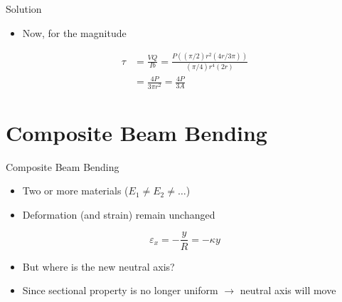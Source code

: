 \documentclass[10pt, svgnames]{beamer}
\begin{document}
\begin{frame}[label={sec:org01c7e02}]{Solution}
\begin{itemize}
\item Now, for the magnitude
\end{itemize}

\begin{align*}
  \tau &= \frac{VQ}{Ib} = \frac{P ((\pi/2) r^{2} (4r/3\pi))}{(\pi/4)r^{4}(2r)} \\
       &= \frac{4P}{3 \pi r^{2}} = \frac{4P}{3A}
\end{align*}
\end{frame}

\section{Composite Beam Bending}
\label{composite-beam-bending}
\begin{frame}[label={sec:org819f415}]{Composite Beam Bending}
\begin{itemize}
\item Two or more materials (\(E_{1} \neq E_{2} \neq \ldots\))

\item Deformation (and strain) remain unchanged
\end{itemize}

\[\varepsilon_x = -\frac{y}{R} = -\kappa y\]

\begin{itemize}
\item But where is the new neutral axis?

\item Since sectional property is no longer uniform \(\rightarrow\) neutral
axis will move
\end{itemize}
\end{frame}
\end{document}
